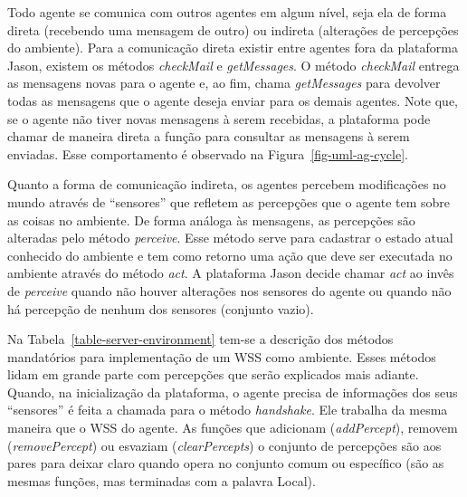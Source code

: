 Todo agente se comunica com outros agentes em algum nível, seja ela de forma
direta (recebendo uma mensagem de outro) ou indireta (alterações de percepções
do ambiente). Para a comunicação direta existir entre agentes fora da
plataforma Jason, existem os métodos \emph{checkMail} e \emph{getMessages}. O
método \emph{checkMail} entrega as mensagens novas para o agente e, ao fim,
chama \emph{getMessages} para devolver todas as mensagens que o agente deseja
enviar para os demais agentes. Note que, se o agente não tiver novas mensagens
à serem recebidas, a plataforma pode chamar de maneira direta a função para
consultar as mensagens à serem enviadas. Esse comportamento é observado na
Figura~\ref{fig-uml-ag-cycle}.

Quanto a forma de comunicação indireta, os agentes percebem modificações no
mundo através de ``sensores'' que refletem as percepções que o agente tem
sobre as coisas no ambiente. De forma análoga às mensagens, as percepções são
alteradas pelo método \emph{perceive}. Esse método serve para cadastrar o
estado atual conhecido do ambiente e tem como retorno uma ação que deve ser
executada no ambiente através do método \emph{act}. A plataforma Jason decide
chamar \emph{act} ao invês de \emph{perceive} quando não houver alterações nos
sensores do agente ou quando não há percepção de nenhum dos sensores (conjunto
vazio).

Na Tabela~\ref{table-server-environment} tem-se a descrição dos métodos
mandatórios para implementação de um WSS como ambiente. Esses métodos lidam em
grande parte com percepções que serão explicados mais adiante. Quando, na
inicialização da plataforma, o agente precisa de informações dos seus
``sensores'' é feita a chamada para o método \emph{handshake}. Ele trabalha da
mesma maneira que o WSS do agente. As funções que adicionam
(\emph{addPercept}), removem (\emph{removePercept}) ou
esvaziam (\emph{clearPercepts}) o conjunto de percepções são aos pares para
deixar claro quando opera no conjunto comum ou específico (são as mesmas
funções, mas terminadas com a palavra Local).

